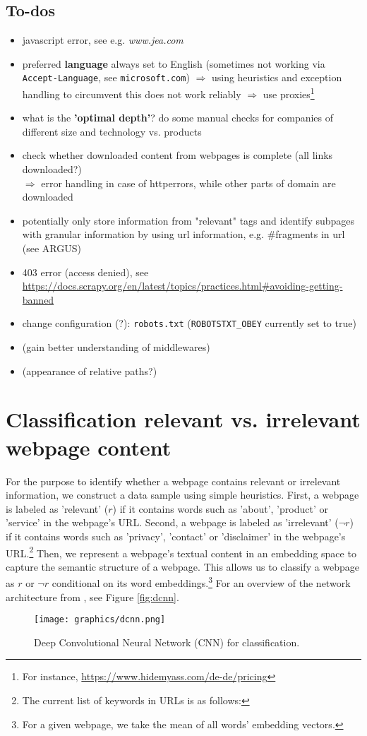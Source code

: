 \documentclass[12pt]{article}
\begin{document}
\subsection{To-dos}
\begin{itemize}
	\item javascript error, see e.g. \textit{www.jea.com}
    \item preferred \textbf{language} always set to English (sometimes not working via \texttt{Accept-Language}, see \texttt{microsoft.com}) $\Rightarrow$ using heuristics and exception handling to circumvent this does not work reliably $\Rightarrow$ use proxies\footnote{For instance, \href{https://www.hidemyass.com/de-de/pricing}{https://www.hidemyass.com/de-de/pricing}}
	\item what is the \textbf{'optimal depth'}? do some manual checks for companies of different size and technology vs. products
	\item check whether downloaded content from webpages is complete (all links downloaded?)\\
	$\Rightarrow$ error handling in case of httperrors, while other parts of domain are downloaded
	\item potentially only store information from "relevant" tags and identify subpages with granular information by using url information, e.g. \#fragments in url (see ARGUS)
	\item 403 error (access denied), see \href{https://docs.scrapy.org/en/latest/topics/practices.html\#avoiding-getting-banned}{https://docs.scrapy.org/en/latest/topics/practices.html\#avoiding-getting-banned}
	\item change configuration (?): \texttt{robots.txt} (\texttt{ROBOTSTXT\_OBEY} currently set to true)
	\item (gain better understanding of middlewares)
	\item (appearance of relative paths?)
\end{itemize}



\section{Classification relevant vs. irrelevant webpage content}
\label{sec:relevIrrelev}
For the purpose to identify whether a webpage contains relevant or irrelevant information, we construct a data sample using simple heuristics.
First, a webpage is labeled as 'relevant' ($r$) if it contains words such as 'about', 'product' or 'service' in the webpage's URL.
Second, a webpage is labeled as 'irrelevant' ($\neg r$) if it contains words such as 'privacy', 'contact' or 'disclaimer' in the webpage's URL.\footnote{The current list of keywords in URLs is as follows: }
Then, we represent a webpage's textual content in an embedding space to capture the semantic structure of a webpage.
This allows us to classify a webpage as $r$ or $\neg r$ conditional on its word embeddings.\footnote{For a given webpage, we take the mean of all words' embedding vectors.}
For an overview of the network architecture from \cite{Kalchbrenner2014}, see Figure \eqref{fig:dcnn}.

\begin{figure}[h]
\centering
\texttt{[image: graphics/dcnn.png]}
\caption{Deep Convolutional Neural Network (CNN) for classification.}
\label{fig:dcnn}
\end{figure}
\end{document}
